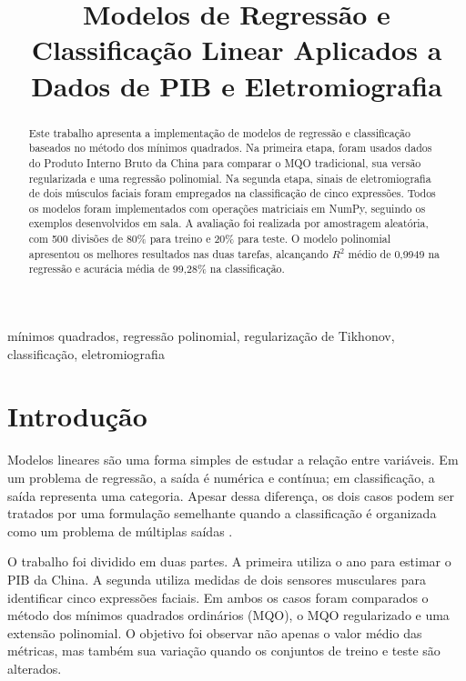 \documentclass[conference]{IEEEtran}
\begin{document}
\title{Modelos de Regressão e Classificação Linear Aplicados a Dados de PIB e Eletromiografia}

\author{
}

\maketitle

\begin{abstract}
Este trabalho apresenta a implementação de modelos de regressão e classificação
baseados no método dos mínimos quadrados. Na primeira etapa, foram usados dados do
Produto Interno Bruto da China para comparar o MQO tradicional, sua versão
regularizada e uma regressão polinomial. Na segunda etapa, sinais de
eletromiografia de dois músculos faciais foram empregados na classificação de
cinco expressões. Todos os modelos foram implementados com operações matriciais em
NumPy, seguindo os exemplos desenvolvidos em sala. A avaliação foi realizada por
amostragem aleatória, com 500 divisões de 80\% para treino e 20\% para teste. O
modelo polinomial apresentou os melhores resultados nas duas tarefas, alcançando
$R^2$ médio de 0,9949 na regressão e acurácia média de 99,28\% na classificação.
\end{abstract}

\begin{IEEEkeywords}
mínimos quadrados, regressão polinomial, regularização de Tikhonov,
classificação, eletromiografia
\end{IEEEkeywords}

\section{Introdução}

Modelos lineares são uma forma simples de estudar a relação entre variáveis. Em
um problema de regressão, a saída é numérica e contínua; em classificação, a
saída representa uma categoria. Apesar dessa diferença, os dois casos podem ser
tratados por uma formulação semelhante quando a classificação é organizada como
um problema de múltiplas saídas \cite{bishop,james}.

O trabalho foi dividido em duas partes. A primeira utiliza o ano para estimar o
PIB da China. A segunda utiliza medidas de dois sensores musculares para
identificar cinco expressões faciais. Em ambos os casos foram comparados o método
dos mínimos quadrados ordinários (MQO), o MQO regularizado e uma extensão
polinomial. O objetivo foi observar não apenas o valor médio das métricas, mas
também sua variação quando os conjuntos de treino e teste são alterados.
\end{document}

